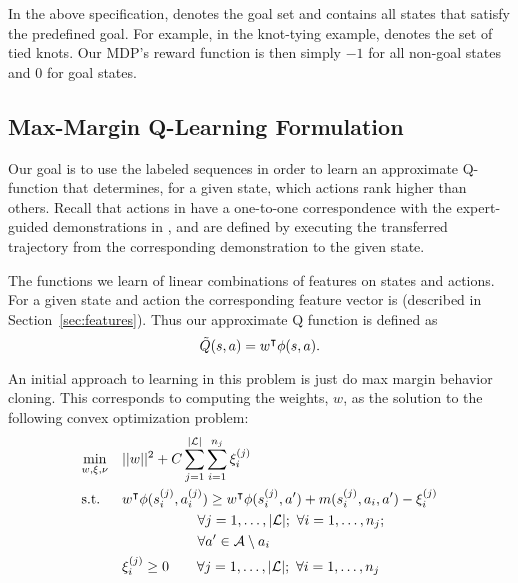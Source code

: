 In the above specification, \goalset{} denotes the goal set and contains all
states that satisfy the predefined goal. For example, in the knot-tying example,
\goalset{} denotes the set of tied knots.  Our MDP's reward function is then
simply $-1$ for all non-goal states and $0$ for goal states.

\subsection{Max-Margin Q-Learning Formulation}
Our goal is to use the labeled sequences  in order to learn an
approximate Q-function that determines, for a given state, which actions
rank higher than others.
Recall that actions in \actionset{} have a one-to-one correspondence with the
expert-guided demonstrations in \demoset{}, and are defined by executing the
transferred trajectory from the corresponding demonstration to the given state.

The functions we learn of linear combinations of features on states and actions.
For a given state \statevar{} and action
\actionvar{} the corresponding feature vector is \features{\statevar{}}{\actionvar{}}
(described in Section~\ref{sec:features}). Thus our approximate Q function is defined as
\begin{equation}
\tilde{Q}(s{}, a{}) = w^\intercal{} \phi({s{}}, {a{}}).
\end{equation}

An initial approach to learning in this problem is just do max margin behavior cloning. 
This corresponds to computing the weights, $w$, as the solution to the following  convex optimization problem: 
\begin{align}
& \underset{w, \xi, \nu}{\text{min}}  & & ||\weights{}||^2 + \marginslackc{} \sum_{j=1}^{\labelsetsize{}} \sum_{i=1}^{\nsub{j}} \marginslacksubsup{i}{(j)}\notag \\
& \text{s.t.} & &\weightst{} \features{\statesubsup{i}{(j)}}{\actionsubsup{i}{(j)}} \geq \weightst{} \phi(\statesubsup{i}{(j)}, \actionvar{}') + \marginvar{}(\statesubsup{i}{(j)}, \actionsub{i}, \actionvar{}') - \marginslacksubsup{i}{(j)} \notag\\
    &&&\hspace{1.9cm}\forall j = 1, \ldots, \labelsetsize{}; \text{ } \forall i = 1, \ldots, \nsub{j}; \notag\\
    &&&\hspace{1.9cm}\forall \actionvar{}' \in \actionset{}\setminus \actionvar{}_i  \label{eq:margin_constr}\\
&    & & \marginslacksubsup{i}{(j)} \geq 0 \hspace{0.7cm} \forall j = 1, \ldots, \labelsetsize{}; \text{ } \forall i = 1, \ldots, \nsub{j} \label{eq:margin_slacks}
\end{align}

